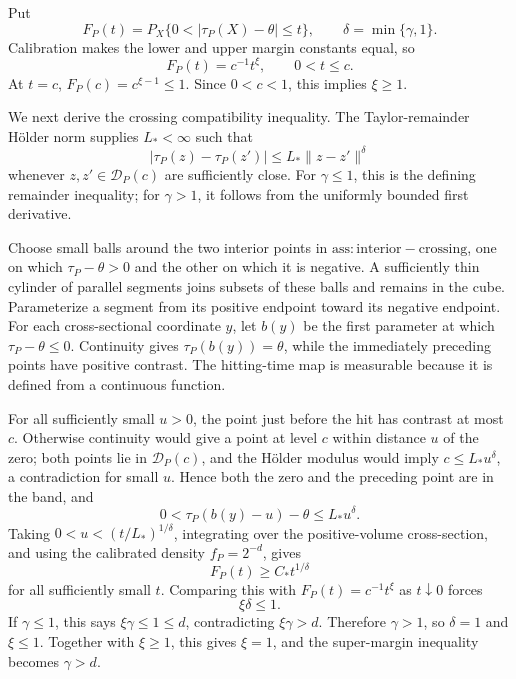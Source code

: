 Put
\[
F_P(t)=P_X\{0<|\tau_P(X)-\theta|\le t\},
\qquad \delta=\min\{\gamma,1\}.
\]
Calibration makes the lower and upper margin constants equal, so
\[
F_P(t)=c^{-1}t^\xi,\qquad 0<t\le c.
\]
At \(t=c\), \(F_P(c)=c^{\xi-1}\le1\). Since \(0<c<1\), this implies \(\xi\ge1\).

We next derive the crossing compatibility inequality. The Taylor-remainder Hölder norm supplies \(L_*<\infty\) such that
\[
|\tau_P(z)-\tau_P(z')|\le L_*\|z-z'\|^\delta
\]
whenever \(z,z'\in\mathcal D_P(c)\) are sufficiently close. For \(\gamma\le1\), this is the defining remainder inequality; for \(\gamma>1\), it follows from the uniformly bounded first derivative.

Choose small balls around the two interior points in \(\mathrm{ass:interior-crossing}\), one on which \(\tau_P-\theta>0\) and the other on which it is negative. A sufficiently thin cylinder of parallel segments joins subsets of these balls and remains in the cube. Parameterize a segment from its positive endpoint toward its negative endpoint. For each cross-sectional coordinate \(y\), let \(b(y)\) be the first parameter at which \(\tau_P-\theta\le0\). Continuity gives \(\tau_P(b(y))=\theta\), while the immediately preceding points have positive contrast. The hitting-time map is measurable because it is defined from a continuous function.

For all sufficiently small \(u>0\), the point just before the hit has contrast at most \(c\). Otherwise continuity would give a point at level \(c\) within distance \(u\) of the zero; both points lie in \(\mathcal D_P(c)\), and the Hölder modulus would imply \(c\le L_*u^\delta\), a contradiction for small \(u\). Hence both the zero and the preceding point are in the band, and
\[
0<\tau_P(b(y)-u)-\theta\le L_*u^\delta.
\]
Taking \(0<u<(t/L_*)^{1/\delta}\), integrating over the positive-volume cross-section, and using the calibrated density \(f_P=2^{-d}\), gives
\[
F_P(t)\ge C_*t^{1/\delta}
\]
for all sufficiently small \(t\). Comparing this with \(F_P(t)=c^{-1}t^\xi\) as \(t\downarrow0\) forces
\[
\xi\delta\le1.
\]
If \(\gamma\le1\), this says \(\xi\gamma\le1\le d\), contradicting \(\xi\gamma>d\). Therefore \(\gamma>1\), so \(\delta=1\) and \(\xi\le1\). Together with \(\xi\ge1\), this gives \(\xi=1\), and the super-margin inequality becomes \(\gamma>d\).